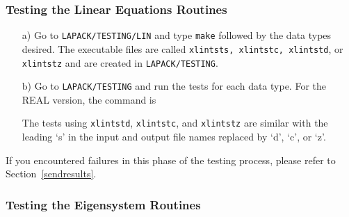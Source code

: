 \documentclass[11pt]{report}
\begin{document}
\subsubsection{Testing the Linear Equations Routines}\label{testlin}

\begin{itemize}

\item[a)]
Go to \texttt{LAPACK/TESTING/LIN} and type \texttt{make} followed by the data types
desired.  The executable files are called \texttt{xlintsts, xlintstc,
xlintstd}, or \texttt{xlintstz} and are created in \texttt{LAPACK/TESTING}.

\item[b)]
Go to \texttt{LAPACK/TESTING} and run the tests for each data type.
For the REAL version, the command is

\noindent
The tests using \texttt{xlintstd}, \texttt{xlintstc}, and \texttt{xlintstz} are similar
with the leading `s' in the input and output file names replaced
by `d', `c', or `z'.

\end{itemize}

If you encountered failures in this phase of the testing process, please
refer to Section~\ref{sendresults}.

\subsubsection{Testing the Eigensystem Routines}\label{testeig}
\end{document}
